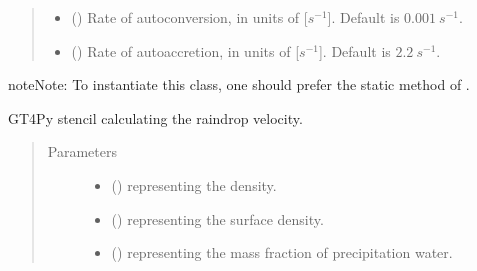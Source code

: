 \documentclass[letterpaper,10pt,english]{sphinxmanual}
\begin{document}
\begin{fulllineitems}
\begin{fulllineitems}
\begin{quote}
\begin{description}
\begin{itemize}
\item {} 
 () \textendash{} Rate of autoconversion, in units of {[}\(s^{-1}\){]}. Default is \(0.001 ~ s^{-1}\).

\item {} 
 () \textendash{} Rate of autoaccretion, in units of {[}\(s^{-1}\){]}. Default is \(2.2 ~ s^{-1}\).

\end{itemize}

\end{description}\end{quote}

\begin{sphinxadmonition}{note}{Note:}
To instantiate this class, one should prefer the static method
 of
.
\end{sphinxadmonition}

\end{fulllineitems}


\begin{fulllineitems}
\label{\detokenize{api:parameterizations.slow_tendency_microphysics_kessler_wrf_saturation.SlowTendencyMicrophysicsKesslerWRFSaturation._stencil_raindrop_fall_velocity_defs}}
GT4Py stencil calculating the raindrop velocity.
\begin{quote}\begin{description}
\item[{Parameters}] \leavevmode\begin{itemize}
\item {} 
 () \textendash{}  representing the density.

\item {} 
 () \textendash{}  representing the surface density.

\item {} 
 () \textendash{}  representing the mass fraction of precipitation water.


\end{itemize}
\end{description}
\end{quote}
\end{fulllineitems}
\end{fulllineitems}
\end{document}
